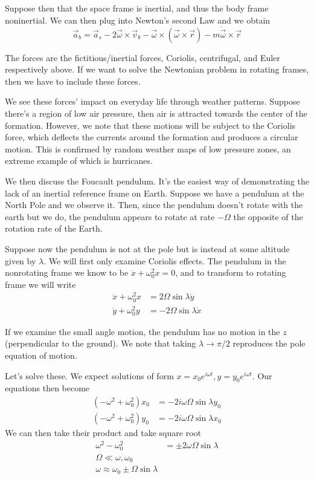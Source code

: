 \documentclass[10pt]{report}
\begin{document}
Suppose then that the space frame is inertial, and thus the body frame noninertial. We can then plug into Newton's second Law and we obtain
$$\vec{a}_b =\vec{a}_s - 2\vec{\omega} \times \vec{v}_b - \vec{\omega}\times\left( \vec{\omega}\times \vec{r} \right) - m\dot{\vec{\omega}}\times \vec{r}$$

The forces are the fictitious/inertial forces, Coriolis, centrifugal, and Euler respectively above. If we want to solve the Newtonian problem in rotating frames, then we have to include these forces.

We see these forces' impact on everyday life through weather patterns. Suppose there's a region of low air pressure, then air is attracted towards the center of the formation. However, we note that these motions will be subject to the Coriolis force, which deflects the currents around the formation and produces a circular motion. This is confirmed by random weather maps of low pressure zones, an extreme example of which is hurricanes. 

We then discuss the Foucault pendulum. It's the easiest way of demonstrating the lack of an inertial reference frame on Earth. Suppose we have a pendulum at the North Pole and we observe it. Then, since the pendulum doesn't rotate with the earth but we do, the pendulum appears to rotate at rate $-\Omega$ the opposite of the rotation rate of the Earth.

Suppose now the pendulum is not at the pole but is instead at some altitude given by $\lambda$. We will first only examine Coriolis effects. The pendulum in the nonrotating frame we know to be $\ddot{x} + \omega_0^2 x = 0$, and to transform to rotating frame we will write 
\begin{align*}
    \ddot{x} + \omega_0^2 x &= 2\Omega \sin \lambda \dot{y}\\ 
    \ddot{y} + \omega_0^2 y &= -2\Omega \sin \lambda \dot{x}
\end{align*}

If we examine the small angle motion, the pendulum has no motion in the $z$ (perpendicular to the ground). We note that taking $\lambda \to \pi/2$ reproduces the pole equation of motion.

Let's solve these. We expect solutions of form $x=x_0e^{i\omega t}, y=y_0e^{i\omega t}$. Our equations then become
\begin{align*}
    \left( -\omega^2 + \omega_0^2 \right)x_0 &= -2i\omega\Omega\sin\lambda y_0\\
    \left( -\omega^2 + \omega_0^2 \right)y_0 &= -2i\omega\Omega\sin\lambda x_0
\end{align*}
We can then take their product and take square root
\begin{align*}
    \omega^2 - \omega_0^2 &= \pm 2\omega\Omega \sin\lambda\\
    \Omega \ll \omega,\omega_0\\
    \omega \approx \omega_0 \pm \Omega \sin \lambda
\end{align*}
\end{document}
